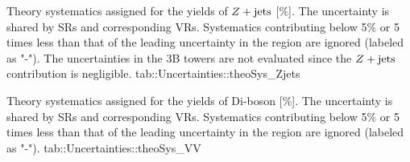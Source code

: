 {Theory systematics assigned for the yields of $Z+\mathrm{jets}$ [$\%$]. The uncertainty is shared by SRs and corresponding VRs. Systematics contributing below 5$\%$ or 5 times less than that of the leading uncertainty in the region are ignored (labeled as "-"). The uncertainties in the 3B towers are not evaluated since the $Z+\mathrm{jets}$ contribution is negligible. }
{tab::Uncertainties::theoSys_Zjets}


{Theory systematics assigned for the yields of Di-boson [$\%$]. The uncertainty is shared by SRs and corresponding VRs. Systematics contributing below 5$\%$ or 5 times less than that of the leading uncertainty in the region are ignored (labeled as "-"). }
{tab::Uncertainties::theoSys_VV}


